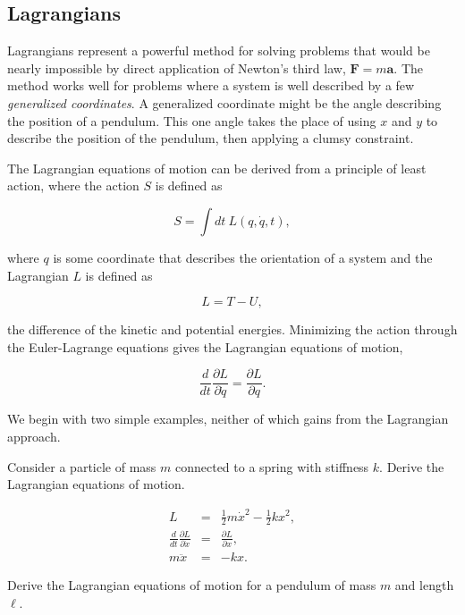 \documentclass[%
oneside,                 %
final,                   %
10pt]{article}
\begin{document}
\subsection*{Lagrangians}

Lagrangians represent a powerful method for solving problems that
would be nearly impossible by direct application of Newton's third
law, $\bm{F}=m\bm{a}$. The method works well for problems where a
system is well described by a few \textit{generalized coordinates}. A
generalized coordinate might be the angle describing the position of a
pendulum. This one angle takes the place of using $x$ and $y$ to
describe the position of the pendulum, then applying a clumsy
constraint.

The Lagrangian equations of motion can be derived from a principle of
least action, where the action $S$ is defined as

\begin{equation}
S=\int dt~ L(q,\dot{q},t),
\end{equation}

where $q$ is some coordinate that describes the orientation of a
system and the Lagrangian $L$ is defined as

\begin{equation}
L=T-U,
\end{equation}

the difference of the kinetic and potential energies. Minimizing the
action through the Euler-Lagrange equations gives the Lagrangian
equations of motion,

\begin{equation}
\frac{d}{dt}\frac{\partial L}{\partial \dot{q}}=\frac{\partial L}{\partial q}.
\end{equation}

We begin with two simple examples, neither of which gains from the Lagrangian approach.

Consider a particle of mass $m$ connected to a spring with stiffness $k$. Derive the Lagrangian equations of motion.

\begin{eqnarray*}
L&=&\frac{1}{2}m\dot{x}^2-\frac{1}{2}kx^2,\\
\frac{d}{dt}\frac{\partial L}{\partial \dot{x}}&=&\frac{\partial L}{\partial x},\\
m\ddot{x}&=&-kx.
\end{eqnarray*}

Derive the Lagrangian equations of motion for a pendulum of mass $m$
and length $\ell$.
\end{document}

